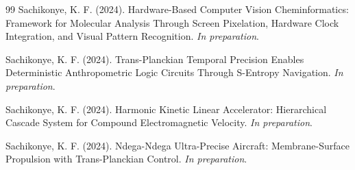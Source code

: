 \documentclass[12pt,a4paper]{article}
\begin{document}
\begin{thebibliography}{99}
Sachikonye, K. F. (2024). Hardware-Based Computer Vision Cheminformatics: Framework for Molecular Analysis Through Screen Pixelation, Hardware Clock Integration, and Visual Pattern Recognition. \textit{In preparation}.

Sachikonye, K. F. (2024). Trans-Planckian Temporal Precision Enables Deterministic Anthropometric Logic Circuits Through S-Entropy Navigation. \textit{In preparation}.

Sachikonye, K. F. (2024). Harmonic Kinetic Linear Accelerator: Hierarchical Cascade System for Compound Electromagnetic Velocity. \textit{In preparation}.

Sachikonye, K. F. (2024). Ndega-Ndega Ultra-Precise Aircraft: Membrane-Surface Propulsion with Trans-Planckian Control. \textit{In preparation}.

\end{thebibliography}
\end{document}
